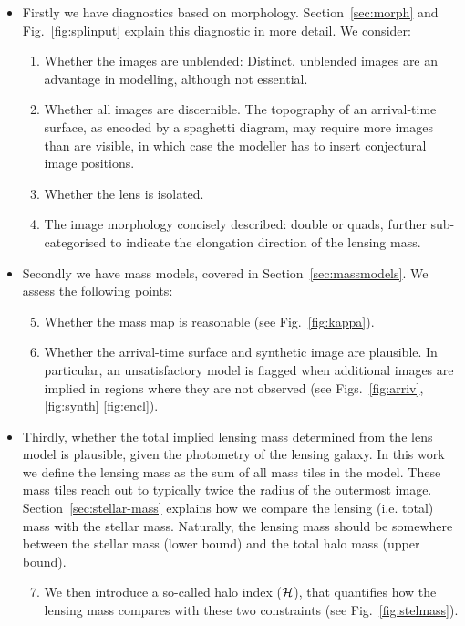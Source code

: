 \begin{itemize}
\item Firstly we have diagnostics based on morphology.
  Section~\ref{sec:morph} and Fig.~\ref{fig:splinput} explain
  this diagnostic in more detail. We consider:
\begin{enumerate}
\item Whether the images are unblended:  Distinct, unblended images are
  an advantage in modelling, although not essential.
\item Whether all images are discernible.  The topography of an
  arrival-time surface, as encoded by a spaghetti diagram, may require
  more images than are visible, in which case the modeller has to
  insert conjectural image positions.
\item Whether the lens is isolated.
\item The image morphology concisely described: double or quads,
  further sub-categorised to indicate the elongation direction of the
  lensing mass.
\end{enumerate}
\item Secondly we have mass models, covered in Section~\ref{sec:massmodels}.
  We assess the following points:
\begin{enumerate}
\setcounter{enumi}{4}
\item Whether the mass map is reasonable (see Fig.~\ref{fig:kappa}).
\item Whether the arrival-time surface and synthetic image are
  plausible. In particular, an unsatisfactory model is flagged when 
  additional images are implied in regions
  where they are not observed (see Figs.~\ref{fig:arriv}, \ref{fig:synth} \ref{fig:encl}).
\end{enumerate}
\item Thirdly, whether the total implied lensing mass determined from
  the lens model is plausible, given the photometry of the lensing
  galaxy.  In this work we define the lensing mass as the sum of all
  mass tiles in the model.  These mass tiles reach out to typically
  twice the radius of the outermost image.
  Section~\ref{sec:stellar-mass} explains how we compare the lensing
  (i.e. total) mass with the stellar mass. Naturally, the lensing
  mass should be somewhere between the stellar mass (lower bound)
  and the total halo mass (upper bound).
\begin{enumerate}
\setcounter{enumi}{6}
\item We then introduce a so-called halo index ($\mathcal{H}$), that
  quantifies how the lensing mass compares with these two
  constraints (see Fig.~\ref{fig:stelmass}).
\end{enumerate}
\end{itemize}






